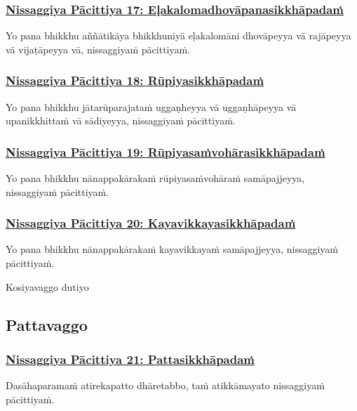 \subsubsection*{\hyperref[forf-exp17]{Nissaggiya Pācittiya 17: Eḷakalomadhovāpanasikkhāpadaṁ}}
\label{np17}
Yo pana bhikkhu aññātikāya bhikkhuniyā eḷakalomāni dhovāpeyya vā rajāpeyya vā vijaṭāpeyya vā, nissaggiyaṁ pācittiyaṁ.

\subsubsection*{\hyperref[forf-exp18]{Nissaggiya Pācittiya 18: Rūpiyasikkhāpadaṁ}}
\label{np18}
Yo pana bhikkhu jātarūparajataṁ uggaṇheyya vā uggaṇhāpeyya vā upanikkhittaṁ vā sādiyeyya, nissaggiyaṁ pācittiyaṁ.

\subsubsection*{\hyperref[forf-exp19]{Nissaggiya Pācittiya 19: Rūpiyasaṁvohārasikkhāpadaṁ}}
\label{np19}
Yo pana bhikkhu nānappakārakaṁ rūpiyasaṁvohāraṁ samāpajjeyya, nissaggiyaṁ pācittiyaṁ.

\subsubsection*{\hyperref[forf-exp20]{Nissaggiya Pācittiya 20: Kayavikkayasikkhāpadaṁ}}
\label{np20}
Yo pana bhikkhu nānappakārakaṁ kayavikkayaṁ samāpajjeyya, nissaggiyaṁ pācittiyaṁ.

\begin{center}
  Kosiyavaggo dutiyo
\end{center}

\subsection{Pattavaggo}
\vspace{0.2cm}

\subsubsection*{\hyperref[forf-exp21]{Nissaggiya Pācittiya 21: Pattasikkhāpadaṁ}}
\label{np21}
Dasāhaparamaṁ atirekapatto dhāretabbo, taṁ atikkāmayato nissaggiyaṁ pācittiyaṁ.

